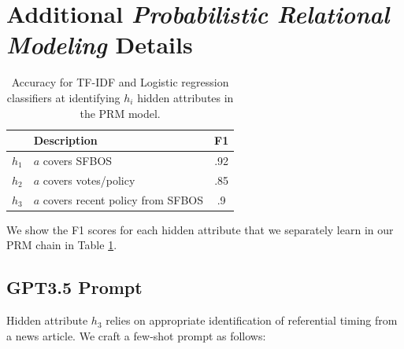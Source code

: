 \documentclass[11pt]{article}
\begin{document}
\section{Additional \textit{Probabilistic Relational Modeling} Details}
\label{app:add-prm-results}

\begin{table}[]
    \centering
    \begin{tabular}{c l c}
        \toprule
         {} & Description & F1 \\
         \midrule
         $h_1$ & $a$ covers SFBOS & .92 \\ 
         $h_2$ & $a$ covers votes/policy & .85 \\
         $h_3$ & $a$ covers recent policy from SFBOS & .9 \\
         \bottomrule
    \end{tabular}
    \caption{Accuracy for TF-IDF and Logistic regression classifiers at identifying $h_i$ hidden attributes in the PRM model.}
    \label{tab:prm_hidden_accuracies}
\end{table}

We show the F1 scores for each hidden attribute that we separately learn in our PRM chain in Table \ref{tab:prm_hidden_accuracies}.

\subsection{GPT3.5 Prompt}

Hidden attribute $h_3$ relies on appropriate identification of referential timing from a news article. We craft a few-shot prompt as follows:
\end{document}
